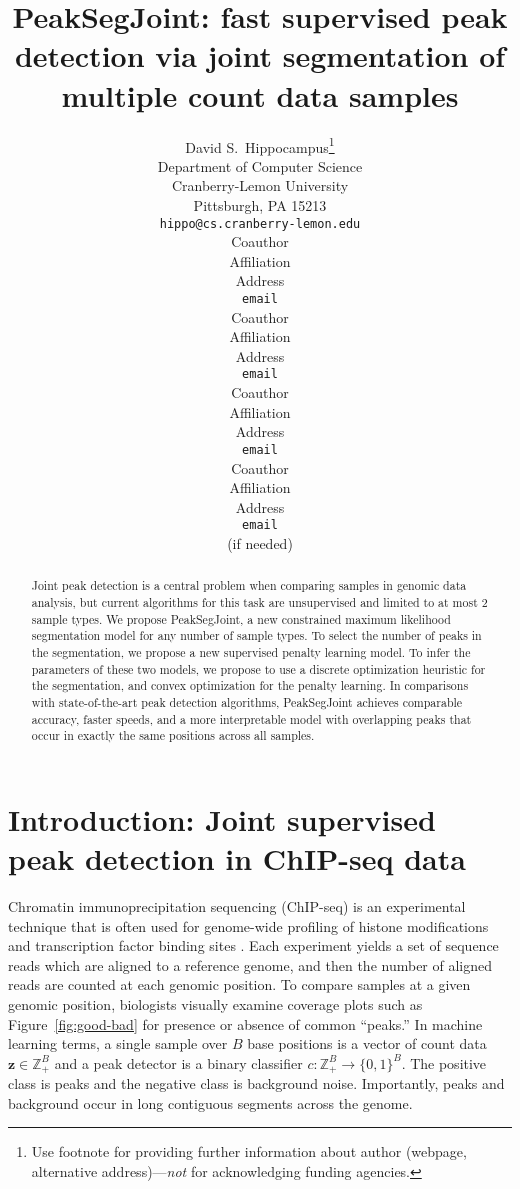 \documentclass{article} %
\title{PeakSegJoint: fast supervised peak detection via joint
  segmentation of multiple count data samples}
\author{
David S.~Hippocampus\thanks{ Use footnote for providing further information
about author (webpage, alternative address)---\emph{not} for acknowledging
funding agencies.} \\
Department of Computer Science\\
Cranberry-Lemon University\\
Pittsburgh, PA 15213 \\
\texttt{hippo@cs.cranberry-lemon.edu} \\
\And
Coauthor \\
Affiliation \\
Address \\
\texttt{email} \\
\AND
Coauthor \\
Affiliation \\
Address \\
\texttt{email} \\
\And
Coauthor \\
Affiliation \\
Address \\
\texttt{email} \\
\And
Coauthor \\
Affiliation \\
Address \\
\texttt{email} \\
(if needed)\\
}
\newcommand{\ZZ}{\mathbb Z}
\begin{document}
\maketitle

\begin{abstract}
  Joint peak detection is a central problem when comparing samples in
  genomic data analysis, but current algorithms for this task are
  unsupervised and limited to at most 2 sample types. We propose
  PeakSegJoint, a new constrained maximum likelihood segmentation
  model for any number of sample types. To select the number of peaks
  in the segmentation, we propose a new supervised penalty learning
  model. To infer the parameters of these two models, we propose to
  use a discrete optimization heuristic for the segmentation, and
  convex optimization for the penalty learning. In comparisons with
  state-of-the-art peak detection algorithms, PeakSegJoint achieves
  comparable accuracy, faster speeds, and a more interpretable model
  with overlapping peaks that occur in exactly the same positions
  across all samples.
\end{abstract}

\section{Introduction: Joint supervised peak detection in ChIP-seq data}


Chromatin immunoprecipitation sequencing (ChIP-seq) is an experimental
technique that is often used for genome-wide profiling of histone
modifications and transcription factor binding sites
\citep{practical}. Each experiment yields a set of sequence reads
which are aligned to a reference genome, and then the number of
aligned reads are counted at each genomic position. To compare samples
at a given genomic position, biologists visually examine coverage
plots such as Figure~\ref{fig:good-bad} for presence or absence of
common ``peaks.'' In machine learning terms, a single sample over $B$
base positions is a vector of count data $\mathbf z\in\ZZ_+^B$ and a
peak detector is a binary classifier $c:\ZZ_+^B\rightarrow\{0,
1\}^B$. The positive class is peaks and the negative class is
background noise. Importantly, peaks and background occur in long
contiguous segments across the genome.
\end{document}
